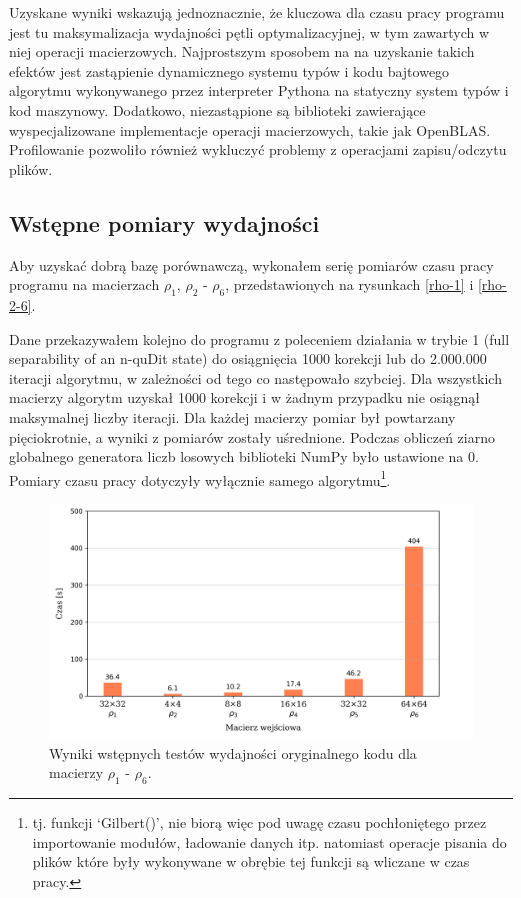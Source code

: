 \documentclass[11pt, a4paper]{article}
\begin{document}
\begin{sloppypar}
    Uzyskane wyniki wskazują jednoznacznie, że kluczowa dla czasu pracy programu jest tu
    maksymalizacja wydajności pętli optymalizacyjnej, w tym zawartych w niej operacji
    macierzowych. Najprostszym sposobem na na uzyskanie takich efektów jest zastąpienie dynamicznego
    systemu typów i kodu bajtowego algorytmu wykonywanego przez interpreter Pythona na statyczny
    system typów i kod maszynowy. Dodatkowo, niezastąpione są biblioteki zawierające wyspecjalizowane
    implementacje operacji macierzowych, takie jak OpenBLAS. Profilowanie pozwoliło również
    wykluczyć problemy z operacjami zapisu/odczytu plików.

    \subsection{Wstępne pomiary wydajności}
    Aby uzyskać dobrą bazę porównawczą, wykonałem serię pomiarów czasu pracy programu na
    macierzach $\rho_{1}$, $\rho_{2}$ - $\rho_{6}$, przedstawionych na rysunkach
    \ref{rho-1} i \ref{rho-2-6}.

    Dane przekazywałem kolejno do programu z poleceniem działania w trybie 1 (full separability
    of an n-quDit state) do osiągnięcia 1000 korekcji lub do 2.000.000 iteracji algorytmu,
    w zależności od tego co następowało szybciej. Dla wszystkich macierzy algorytm uzyskał
    1000 korekcji i w żadnym przypadku nie osiągnął maksymalnej liczby iteracji. Dla
    każdej macierzy pomiar był powtarzany pięciokrotnie, a wyniki z pomiarów zostały uśrednione.
    Podczas obliczeń ziarno globalnego generatora liczb losowych biblioteki NumPy było
    ustawione na 0. Pomiary czasu pracy dotyczyły wyłącznie samego algorytmu\footnote{tj.
    funkcji `Gilbert()', nie biorą więc pod uwagę czasu pochłoniętego przez importowanie
    modułów, ładowanie danych itp. natomiast operacje pisania do plików które były wykonywane
    w obrębie tej funkcji są wliczane w czas pracy.}.

    \begin{figure}[ht]
      \centering
      \includegraphics[width=1.0\textwidth]{"resources/original_performance_tests.png"}
      \caption{Wyniki wstępnych testów wydajności oryginalnego kodu dla macierzy $\rho_{1}$ - $\rho
      _{6}$.}
      \label{pre-perf}
    \end{figure}


\end{sloppypar}
\end{document}
